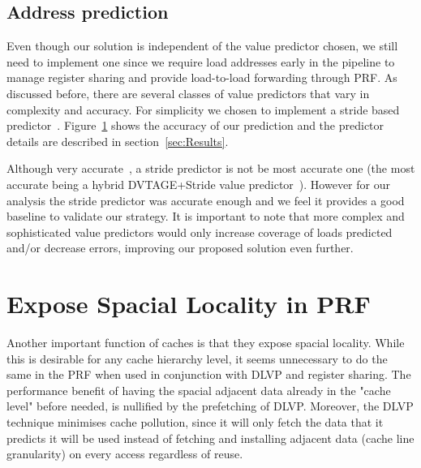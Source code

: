 \documentclass{sig-alternate}
\begin{document}
\subsection{Address prediction}
Even though our solution is independent of the value predictor chosen, we still need to implement one since we require load addresses early in the pipeline to manage register sharing and provide load-to-load forwarding through PRF. As discussed before, there are several classes of value predictors that vary in complexity and accuracy. For simplicity we chosen to implement a stride based predictor~\cite{}. Figure~\ref{} shows the accuracy of our prediction and the predictor details are described in section~\ref{sec:Results}. 

Although very accurate~\cite{}, a stride predictor is not be most accurate one (the most accurate being a hybrid DVTAGE+Stride value predictor~\cite{}). However for our analysis the stride predictor was accurate enough and we feel it provides a good baseline to validate our strategy. It is important to note that more complex and sophisticated value predictors would only increase coverage of loads predicted and/or decrease errors, improving our proposed solution even further.  





















\section{Expose Spacial Locality in PRF}
Another important function of caches is that they expose spacial locality. While this is desirable for any cache hierarchy level, it seems unnecessary to do the same in the PRF when used in conjunction with DLVP and register sharing. The performance benefit of having the spacial adjacent data already in the "cache level" before needed, is nullified by the prefetching of DLVP. Moreover, the DLVP technique minimises cache pollution, since it will only fetch the data that it predicts it will be used instead of fetching and installing adjacent data (cache line granularity) on every access regardless of reuse.
\end{document}
